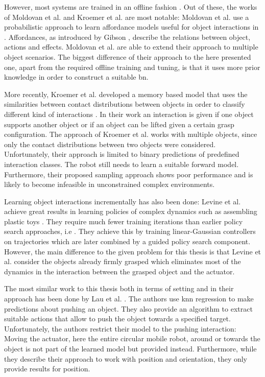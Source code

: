 However, most systems are trained in an offline fashion \cite{nishide2008predicting, moldovan2012learning, contactPrediction}. Out of these, the works of Moldovan et al. and Kroemer et al. are most notable:
Moldovan et al. use a probabilistic approach to learn affordance models useful for object interactions in \cite{moldovan2012learning}. Affordances, as introduced by Gibson \cite{affordances}, describe the relations between object, actions and effects. Moldovan et al. are able to extend their approach to multiple object scenarios. The biggest difference of their approach to the here presented one, apart from the required offline training and tuning, is that it uses more prior knowledge in order to construct a suitable \gls{bn}.

More recently, Kroemer et al. developed a memory based model that uses the similarities between contact distributions between objects in order to classify different kind of interactions \cite{contactPrediction}. In their work an interaction is given if one object supports another object or if an object can be lifted given a certain grasp configuration. The approach of Kroemer et al. works with multiple objects, since only the contact distributions between two objects were considered. Unfortunately, their approach is limited to binary predictions of predefined interaction classes. The robot still needs to learn a suitable forward model. Furthermore, their proposed sampling approach shows poor performance and is likely to become infeasible in unconstrained complex environments.

Learning object interactions incrementally has also been done:
Levine et al. achieve great results in learning policies of complex dynamics  %
such as assembling plastic toys \cite{levine2015learning}. They require much fewer training iterations than earlier policy search approaches, i.e \cite{otherPolicySearchs}. They achieve this by training linear-Gaussian controllers on trajectories which are later combined by a guided policy search component.
However, the main difference to the given problem for this thesis is that Levine et al. consider the objects already firmly grasped which eliminates most of the dynamics in the interaction between the grasped object and the actuator.

The most similar work to this thesis both in terms of setting and in their approach has been done by 
Lau et al. \cite{pushing}. The authors use \gls{knn} regression to make predictions about pushing an object. They also provide an algorithm to extract suitable actions that allow to push the object towards a specified target. Unfortunately, the authors restrict their model to the pushing interaction: Moving the actuator, here the entire circular mobile robot, around or towards the object is not part of the learned model but provided instead. Furthermore, while they describe their approach to work with position and orientation, they only provide results for position. 


